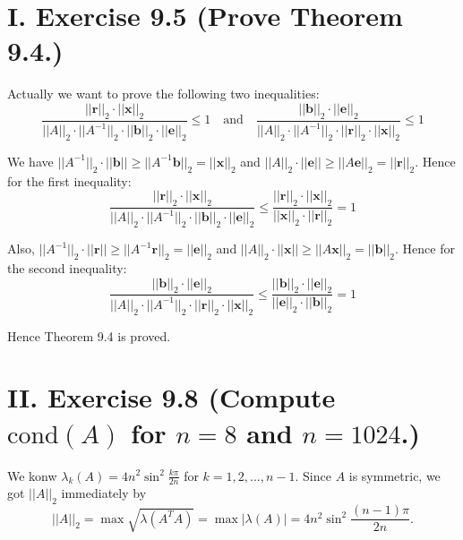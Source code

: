 \documentclass[twoside,a4paper]{article}
\begin{document}
\pagestyle{fancy}
\fancyhead{}


\section*{I. Exercise 9.5 (Prove Theorem 9.4.)}

\;\;\;\;\;\;Actually we want to prove the following two inequalities:
\begin{equation}
    \frac{||\mathbf{r}||_2\cdot||\mathbf{x}||_2}{||A||_2\cdot||A^{-1}||_2\cdot||\mathbf{b}||_2\cdot||\mathbf{e}||_2}\leq 1 \quad \text{and} \quad
    \frac{||\mathbf{b}||_2\cdot||\mathbf{e}||_2}{||A||_2\cdot||A^{-1}||_2\cdot||\mathbf{r}||_2\cdot||\mathbf{x}||_2}\leq 1
\end{equation}

We have $||A^{-1}||_2\cdot ||\mathbf{b}||\geq ||A^{-1}\mathbf{b}||_2=||\mathbf{x}||_2$ and $||A||_2\cdot ||\mathbf{e}||\geq ||A\mathbf{e}||_2=||\mathbf{r}||_2$. Hence for the first inequality:
\begin{equation*}
    \frac{||\mathbf{r}||_2\cdot||\mathbf{x}||_2}{||A||_2\cdot||A^{-1}||_2\cdot||\mathbf{b}||_2\cdot||\mathbf{e}||_2}\leq \frac{||\mathbf{r}||_2\cdot||\mathbf{x}||_2}{||\mathbf{x}||_2\cdot||\mathbf{r}||_2} = 1
\end{equation*}

Also, $||A^{-1}||_2\cdot ||\mathbf{r}||\geq ||A^{-1}\mathbf{r}||_2=||\mathbf{e}||_2$ and $||A||_2\cdot ||\mathbf{x}||\geq ||A\mathbf{x}||_2=||\mathbf{b}||_2$. Hence for the second inequality:
\begin{equation*}
    \frac{||\mathbf{b}||_2\cdot||\mathbf{e}||_2}{||A||_2\cdot||A^{-1}||_2\cdot||\mathbf{r}||_2\cdot||\mathbf{x}||_2}\leq \frac{||\mathbf{b}||_2\cdot||\mathbf{e}||_2}{||\mathbf{e}||_2\cdot||\mathbf{b}||_2} = 1
\end{equation*}

Hence Theorem 9.4 is proved.

\section*{II. Exercise 9.8 (Compute $\text{cond}(A)$ for $n=8$ and $n=1024$.)}

\;\;\;\;\;\;We konw $\lambda_k(A)=4n^2\sin^2\frac{k\pi}{2n}$ for $k=1,2,...,n-1$. Since $A$ is symmetric, we got $||A||_2$ immediately by
\begin{equation*}
    ||A||_2=\max \sqrt{\lambda(A^TA)} = \max|\lambda(A)| = 4n^2\sin^2\frac{(n-1)\pi}{2n}.
\end{equation*}
\end{document}
